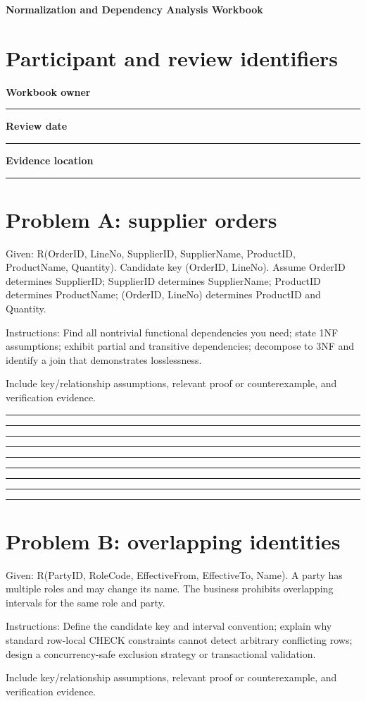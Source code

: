 \documentclass[11pt,letterpaper]{article}
\newcommand{\ResponseLine}{\par\vspace{1.05em}\noindent\rule{\linewidth}{0.4pt}\par}
\newcommand{\ResponseArea}{\ResponseLine\ResponseLine\ResponseLine}
\begin{document}
\begin{center}
{\LARGE\bfseries\color{navy} Normalization and Dependency Analysis Workbook}\par
\vspace{0.25em}{\large Printable Template | guided exercises}\par
{}
\end{center}
\vspace{0.8em}
\section{Participant and review identifiers}
\textbf{Workbook owner}\ResponseLine\textbf{Review date}\ResponseLine\textbf{Evidence location}\ResponseLine
\section{Problem A: supplier orders}
Given: R(OrderID, LineNo, SupplierID, SupplierName, ProductID, ProductName, Quantity). Candidate key (OrderID, LineNo). Assume OrderID determines SupplierID; SupplierID determines SupplierName; ProductID determines ProductName; (OrderID, LineNo) determines ProductID and Quantity.


Instructions: Find all nontrivial functional dependencies you need; state 1NF assumptions; exhibit partial and transitive dependencies; decompose to 3NF and identify a join that demonstrates losslessness.

Include key/relationship assumptions, relevant proof or counterexample, and verification evidence.

\ResponseArea\ResponseArea\ResponseArea
\section{Problem B: overlapping identities}
Given: R(PartyID, RoleCode, EffectiveFrom, EffectiveTo, Name). A party has multiple roles and may change its name. The business prohibits overlapping intervals for the same role and party.


Instructions: Define the candidate key and interval convention; explain why standard row-local CHECK constraints cannot detect arbitrary conflicting rows; design a concurrency-safe exclusion strategy or transactional validation.

Include key/relationship assumptions, relevant proof or counterexample, and verification evidence.
\end{document}
